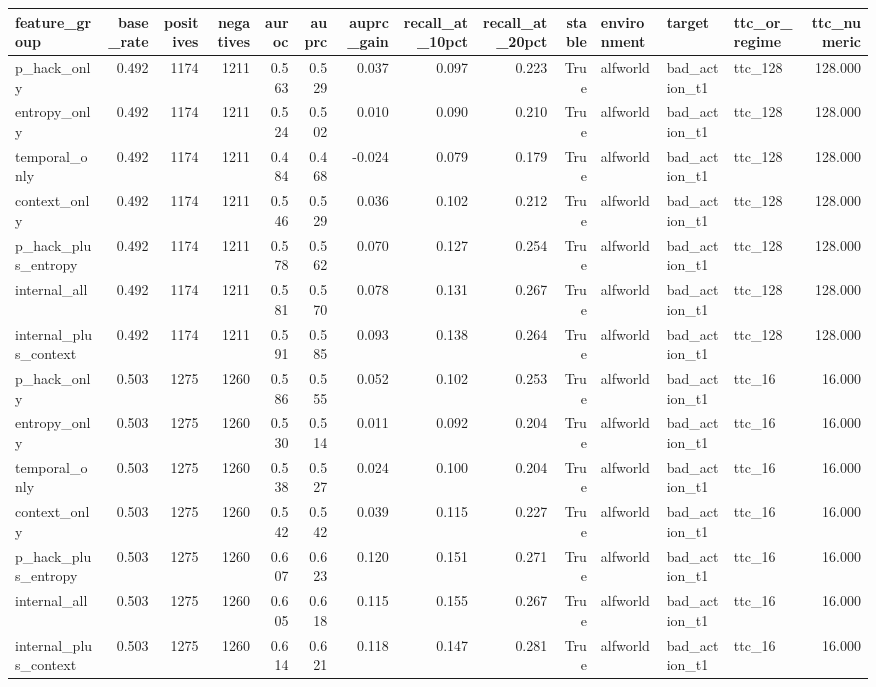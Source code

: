 \begin{tabular}{lrrrrrrrrrlllr}
\toprule
feature_group & base_rate & positives & negatives & auroc & auprc & auprc_gain & recall_at_10pct & recall_at_20pct & stable & environment & target & ttc_or_regime & ttc_numeric \\
\midrule
p_hack_only & 0.492 & 1174 & 1211 & 0.563 & 0.529 & 0.037 & 0.097 & 0.223 & True & alfworld & bad_action_t1 & ttc_128 & 128.000 \\
entropy_only & 0.492 & 1174 & 1211 & 0.524 & 0.502 & 0.010 & 0.090 & 0.210 & True & alfworld & bad_action_t1 & ttc_128 & 128.000 \\
temporal_only & 0.492 & 1174 & 1211 & 0.484 & 0.468 & -0.024 & 0.079 & 0.179 & True & alfworld & bad_action_t1 & ttc_128 & 128.000 \\
context_only & 0.492 & 1174 & 1211 & 0.546 & 0.529 & 0.036 & 0.102 & 0.212 & True & alfworld & bad_action_t1 & ttc_128 & 128.000 \\
p_hack_plus_entropy & 0.492 & 1174 & 1211 & 0.578 & 0.562 & 0.070 & 0.127 & 0.254 & True & alfworld & bad_action_t1 & ttc_128 & 128.000 \\
internal_all & 0.492 & 1174 & 1211 & 0.581 & 0.570 & 0.078 & 0.131 & 0.267 & True & alfworld & bad_action_t1 & ttc_128 & 128.000 \\
internal_plus_context & 0.492 & 1174 & 1211 & 0.591 & 0.585 & 0.093 & 0.138 & 0.264 & True & alfworld & bad_action_t1 & ttc_128 & 128.000 \\
p_hack_only & 0.503 & 1275 & 1260 & 0.586 & 0.555 & 0.052 & 0.102 & 0.253 & True & alfworld & bad_action_t1 & ttc_16 & 16.000 \\
entropy_only & 0.503 & 1275 & 1260 & 0.530 & 0.514 & 0.011 & 0.092 & 0.204 & True & alfworld & bad_action_t1 & ttc_16 & 16.000 \\
temporal_only & 0.503 & 1275 & 1260 & 0.538 & 0.527 & 0.024 & 0.100 & 0.204 & True & alfworld & bad_action_t1 & ttc_16 & 16.000 \\
context_only & 0.503 & 1275 & 1260 & 0.542 & 0.542 & 0.039 & 0.115 & 0.227 & True & alfworld & bad_action_t1 & ttc_16 & 16.000 \\
p_hack_plus_entropy & 0.503 & 1275 & 1260 & 0.607 & 0.623 & 0.120 & 0.151 & 0.271 & True & alfworld & bad_action_t1 & ttc_16 & 16.000 \\
internal_all & 0.503 & 1275 & 1260 & 0.605 & 0.618 & 0.115 & 0.155 & 0.267 & True & alfworld & bad_action_t1 & ttc_16 & 16.000 \\
internal_plus_context & 0.503 & 1275 & 1260 & 0.614 & 0.621 & 0.118 & 0.147 & 0.281 & True & alfworld & bad_action_t1 & ttc_16 & 16.000 \\

\end{tabular}
